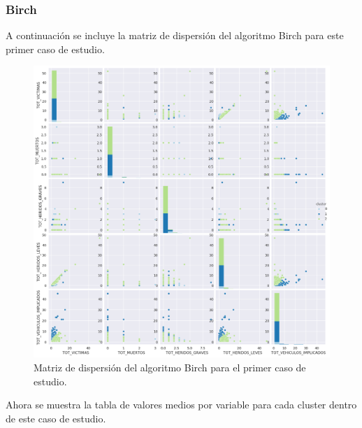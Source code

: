 	\subsubsection{Birch}
	A continuación se incluye la matriz de dispersión del algoritmo Birch para este primer caso de estudio.
	
	\begin{figure}[H]
		\centering
		\includegraphics[scale=0.5]{plots/Birch-HighwayAccidents-ScatterMatrix.png}
		\caption{Matriz de dispersión del algoritmo Birch para el primer caso de estudio.}
	\end{figure}

	Ahora se muestra la tabla de valores medios por variable para cada cluster dentro de este caso de estudio.
	
	\begin{table}[H]
		\centering
		\caption{Tabla de valores medios del algoritmo K-Means para el primer caso de estudio.}
	\end{table}

